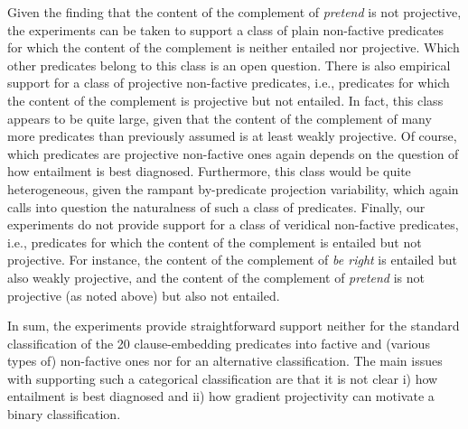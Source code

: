 \documentclass[11pt,fleqn]{article}
\newcommand{\6}{\mbox{$[\hspace*{-.6mm}[$}}
\newcommand{\9}{\mbox{$]\hspace*{-.6mm}]$}}
\begin{document}
{Given the finding that the content of the complement of {\em pretend} is not projective, the experiments can be taken to support a class of plain non-factive predicates for which the content of the complement is neither entailed nor projective. Which other predicates belong to this class is an open question. There is also empirical support for a class of projective non-factive predicates, i.e., predicates for which the content of the complement is projective but not entailed. In fact, this class appears to be quite large, given that the content of the complement of many more predicates than previously assumed is at least weakly projective. Of course, which predicates are projective non-factive ones again depends on the question of how entailment is best diagnosed. Furthermore, this class would be quite heterogeneous, given the rampant by-predicate projection variability, which again calls into question the naturalness of such a class of predicates. Finally, our experiments do not provide support for a class of veridical non-factive predicates, i.e., predicates for which the content of the complement is entailed but not projective. For instance, the content of the complement of {\em be right} is entailed but also weakly projective, and the content of the complement of {\em pretend} is not projective (as noted above) but also not entailed. 

In sum, the experiments provide straightforward support neither for the standard classification of the 20 clause-embedding predicates into factive and (various types of) non-factive ones nor for an alternative classification. The main issues with supporting such a categorical classification are that it is not clear i) how entailment is best diagnosed and ii) how gradient projectivity can motivate a binary classification. 

}
\end{document}
